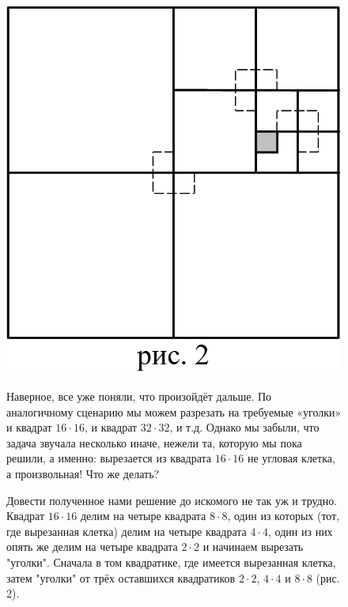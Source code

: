 {\setlength{\intextsep}{2pt}
\begin{figure}[h]
\begin{minipage}{0.27\linewidth}
    \includegraphics[scale=0.15]{./img/kvadrat2}
\end{minipage}
\hfill
\begin{minipage}{0.72\linewidth}\setlength{\parindent}{1.5em}
    Наверное, все уже поняли, что произойдёт дальше. По аналогичному сценарию мы можем разрезать на требуемые «уголки» и квадрат $16 \cdot 16$, и квадрат $32 \cdot 32$, и т.д. Однако мы забыли, что задача звучала несколько иначе, нежели та, которую мы пока решили, а именно: вырезается из квадрата $16 \cdot 16$ не угловая клетка, а произвольная! Что же делать? 
    \par 
    Довести полученное нами решение до искомого не так уж и трудно. Квадрат $16 \cdot 16$ делим на четыре квадрата $8 \cdot 8$, один из которых (тот, где вырезанная клетка) делим на четыре квадрата $4 \cdot 4$, один из них опять же делим на четыре квадрата $2 \cdot 2$ и начинаем вырезать "уголки". Сначала в том квадратике, где имеется вырезанная клетка, затем "уголки" от трёх
оставшихся квадратиков $2 \cdot 2$, $4 \cdot 4$ и $8 \cdot 8$ (рис. 2). 
\end{minipage}
\end{figure}}


